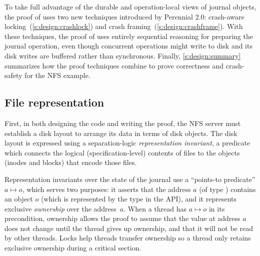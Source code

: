 To take full advantage of the durable and operation-local views of
journal objects, the proof of  uses two new techniques introduced by
Perennial 2.0: crash-aware locking~(\autoref{s:design:crashlock}) and crash
framing~(\autoref{s:design:crashframe}). With these techniques, the proof of
 uses entirely sequential reasoning for preparing the
journal operation, even though concurrent operations might write to disk and its
disk writes are buffered rather than synchronous.
Finally, \autoref{s:design:summary} summarizes how the proof
techniques combine to prove correctness and crash-safety for the NFS 
example.


\subsection{File representation}
\label{s:design:rep}

First, in both designing the code and writing the proof, the NFS server must
establish a disk layout to arrange its data in terms of disk objects. The disk
layout is expressed using a separation-logic \emph{representation invariant}, a
predicate which connects the logical (specification-level) contents of files to the objects (inodes and
blocks) that encode those files.


Representation invariants over the state of the journal use a
``points-to predicate'' $a \mapsto o$, which serves two purposes: it asserts
that the address $a$ (of type ) contains an object $o$ (which is
represented by the  type in the API), and it represents exclusive
\emph{ownership} over the address~$a$. When a thread has $a \mapsto o$ in its
precondition, ownership allows the proof to assume that the value at address $a$
does not change until the thread gives up ownership, and that it will not be
read by other threads.  Locks help threads transfer ownership so a thread only
retains exclusive ownership during a critical section.

